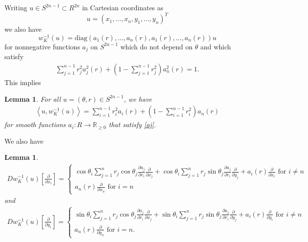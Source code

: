 \documentclass[12pt]{amsart}
\newtheorem{lemma}[theorem]{Lemma}
\theoremstyle{definition}
\newcommand{\RR}{{\mathbb R}}
\begin{document}
Writing $u \in S^{2n-1} \subset R^{2n}$ in Cartesian coordinates as $$u=(x_1, \dots, x_n,y_1, \dots, y_n)^T$$ we also have 
$$w^{-1}_K(u) = \mathrm{diag}(a_1(r),\dots,a_n(r),a_1(r),\dots,a_n(r)) u$$ for nonnegative functions $a_j$ on $S^{2n-1}$ which do not depend on $\theta$ and which satisfy \begin{align}\label{aj}\sum_{j=1}^{n-1} r_j^2 a_j^2(r)  + \left(1 -\sum_{j=1}^{n-1} r_j^2\right)a_n^2(r)=1.\end{align} This implies 
\begin{lemma}\label{2b}
For all $u =(\theta,r) \in S^{2n-1}$, we have 
\begin{align*}
    \left\langle u,w_K^{-1}(u) \right\rangle = \sum_{i=1}^{n-1} r_i^2 a_i(r) + \left(1-\sum_{i=1}^{n-1}r_i^2\right)a_n(r)
\end{align*}
for smooth functions $a_i \colon R \to \RR_{\geq 0}$ that satisfy \eqref{aj}.
\end{lemma}

We also have 
\begin{lemma}\label{D}
\begin{align*}
D w_K^{-1}(u)\left[\frac{\partial}{\partial x_i}\right] = \begin{cases}
    \displaystyle\cos{\theta_i} \sum_{j=1}^n r_j \cos{\theta_j}\frac{\partial a_j}{\partial r_i}\frac{\partial }{\partial x_j} + \cos{\theta_i} \sum_{j=1}^n r_j \sin{\theta_j}\frac{\partial a_j}{\partial r_i}\frac{\partial }{\partial y_j} +a_i(r) \frac{\partial}{\partial x_i}\,\,\text{for}\,\,i \neq n\\
    \displaystyle a_n(r)\frac{\partial}{\partial x_n} \,\,\text{for}\,\,i=n
\end{cases}
\end{align*}
and
\begin{align*}
D w_K^{-1}(u)\left[\frac{\partial}{\partial y_i}\right] =
    \begin{cases}
    \displaystyle\sin{\theta_i} \sum_{j=1}^n r_j \cos{\theta_j}\frac{\partial a_j}{\partial r_i}\frac{\partial }{\partial x_j} + \sin{\theta_i} \sum_{j=1}^n r_j \sin{\theta_j}\frac{\partial a_j}{\partial r_i}\frac{\partial }{\partial y_j}+ a_i(r) \frac{\partial}{\partial y_i}\,\,\text{for}\,\,i \neq n\\
        \displaystyle a_n(r)\frac{\partial}{\partial y_n} \,\,\text{for}\,\,i=n.
    \end{cases}
\end{align*}
\end{lemma}
\end{document}
